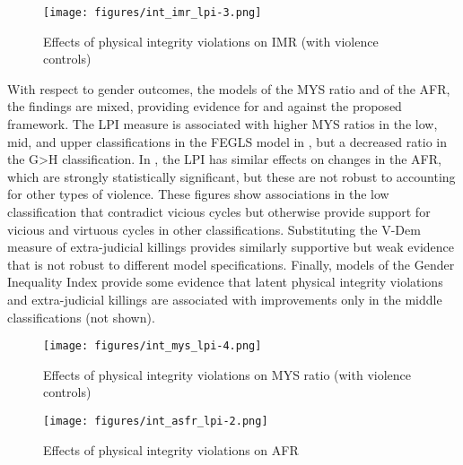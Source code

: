\documentclass[12pt]{article}
\begin{document}
\begin{figure}[!htb]
    \centering
    \caption{Effects of physical integrity violations on IMR (with violence controls)}
    \label{int_imr_lpi}
    \texttt{[image: figures/int\_imr\_lpi-3.png]}
\end{figure}

With respect to gender outcomes, the models of the MYS ratio and of the AFR, the findings are mixed, providing evidence for and against the proposed framework.
The LPI measure is associated with higher MYS ratios in the low, mid, and upper classifications in the FEGLS model in , but a decreased ratio in the G>H classification.
In , the LPI has similar effects on changes in the AFR, which are strongly statistically significant, but these are not robust to accounting for other types of violence.
These figures show associations in the low classification that contradict vicious cycles but otherwise provide support for vicious and virtuous cycles in other classifications.
Substituting the V-Dem measure of extra-judicial killings provides similarly supportive but weak evidence that is not robust to different model specifications.
Finally, models of the Gender Inequality Index provide some evidence that latent physical integrity violations and extra-judicial killings are associated with improvements only in the middle classifications (not shown).

\begin{figure}[!htb]
    \centering
    \caption{Effects of physical integrity violations on MYS ratio (with violence controls)}
    \label{int_mys_lpi}
    \texttt{[image: figures/int\_mys\_lpi-4.png]}
\end{figure}
\begin{figure}[!htb]
    \centering
    \caption{Effects of physical integrity violations on AFR}
    \label{int_asfr_lpi}
    \texttt{[image: figures/int\_asfr\_lpi-2.png]}
\end{figure}


\end{document}

